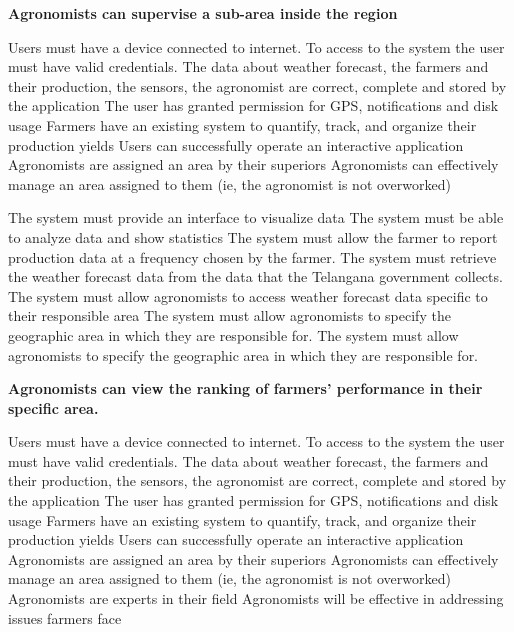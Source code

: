 \begin{itemize}
 \textbf{Agronomists can supervise a sub-area inside the region}
\begin{itemize}
  Users must have a device connected to internet.
 To access to the system the user must have valid credentials.
 The data about weather forecast, the farmers and their production, the sensors, the agronomist are correct, complete and stored by the application
 The user has granted permission for GPS, notifications and disk usage
 Farmers have an existing system to quantify, track, and organize their production yields
 Users can successfully operate an interactive application
 Agronomists are assigned an area by their superiors
 Agronomists can effectively manage an area assigned to them (ie, the agronomist is not overworked)

 The system must provide an interface to visualize data
 The system must be able to analyze data and show statistics
 The system must allow the farmer to report production data at a frequency chosen by the farmer.
 The system must retrieve the weather forecast data from the data that the Telangana government collects.
 The system must allow agronomists to access weather forecast data specific to their responsible area
 The system must allow agronomists to specify the geographic area in which they are responsible for.
 The system must allow agronomists to specify the geographic area in which they are responsible for.
\end{itemize}

 \textbf{Agronomists can view the ranking of farmers’ performance in their specific area.}
\begin{itemize}
  Users must have a device connected to internet.
 To access to the system the user must have valid credentials.
 The data about weather forecast, the farmers and their production, the sensors, the agronomist are correct, complete and stored by the application
 The user has granted permission for GPS, notifications and disk usage
 Farmers have an existing system to quantify, track, and organize their production yields
 Users can successfully operate an interactive application
 Agronomists are assigned an area by their superiors
 Agronomists can effectively manage an area assigned to them (ie, the agronomist is not overworked)
 Agronomists are experts in their field
 Agronomists will be effective in addressing issues farmers face



\end{itemize}
\end{itemize}

